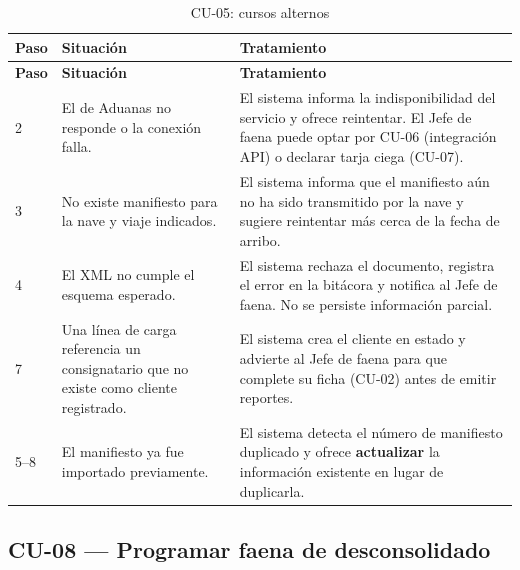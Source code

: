 {\estilotabla
\begin{longtable}{C{0.06\textwidth} L{0.38\textwidth} L{0.48\textwidth}}

\caption{CU-05: cursos alternos}
\label{tab:cu05_alt}
\\

\toprule
\textbf{Paso} & \textbf{Situación} & \textbf{Tratamiento} \\
\midrule
\endfirsthead

\toprule
\textbf{Paso} & \textbf{Situación} & \textbf{Tratamiento} \\
\midrule
\endhead

2 & El  de Aduanas no responde o la conexión falla. &
El sistema informa la indisponibilidad del servicio y ofrece reintentar. El Jefe de faena puede
optar por CU-06 (integración API) o declarar tarja ciega (CU-07). \\
\midrule

3 & No existe manifiesto para la nave y viaje indicados. &
El sistema informa que el manifiesto aún no ha sido transmitido por la nave y sugiere reintentar
más cerca de la fecha de arribo. \\
\midrule

4 & El XML no cumple el esquema esperado. &
El sistema rechaza el documento, registra el error en la bitácora y notifica al Jefe de faena. No
se persiste información parcial. \\
\midrule

7 & Una línea de carga referencia un consignatario que no existe como cliente registrado. &
El sistema crea el cliente en estado  y advierte al Jefe de faena para
que complete su ficha (CU-02) antes de emitir reportes. \\
\midrule

5--8 & El manifiesto ya fue importado previamente. &
El sistema detecta el número de manifiesto duplicado y ofrece \textbf{actualizar} la información
existente en lugar de duplicarla. \\

\bottomrule

\end{longtable}
}

\subsection{CU-08 --- Programar faena de desconsolidado}
\label{subsec:cu08}

